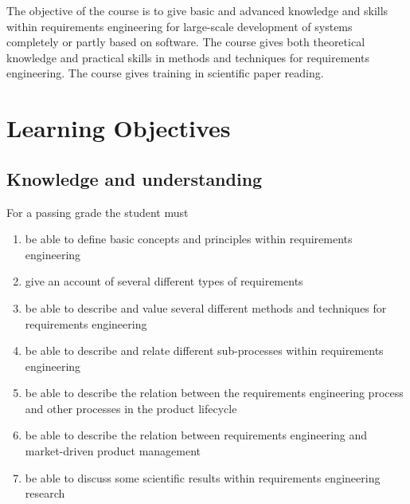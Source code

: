 
\maketitle
\noindent 
The objective of the course is to give basic and advanced knowledge and skills within requirements engineering for large-scale development of systems completely or partly based on software. The course gives both theoretical knowledge and practical skills in methods and techniques for requirements engineering. The course gives training in scientific paper reading.

\section{Learning Objectives}
\subsection{Knowledge and understanding}
For a passing grade the student must
\begin{enumerate}[noitemsep]
\item be able to define basic concepts and principles within requirements engineering 
\item give an account of several different types of requirements
\item be able to describe and value several different methods and techniques for requirements engineering
\item be able to describe and relate different sub-processes within requirements engineering
\item be able to describe the relation between the requirements engineering process and other processes in the product lifecycle
\ifteknolog
	\item be able to describe the relation between requirements engineering and market-driven product management
	\item be able to discuss some scientific results within requirements engineering research
\fi
\end{enumerate}


